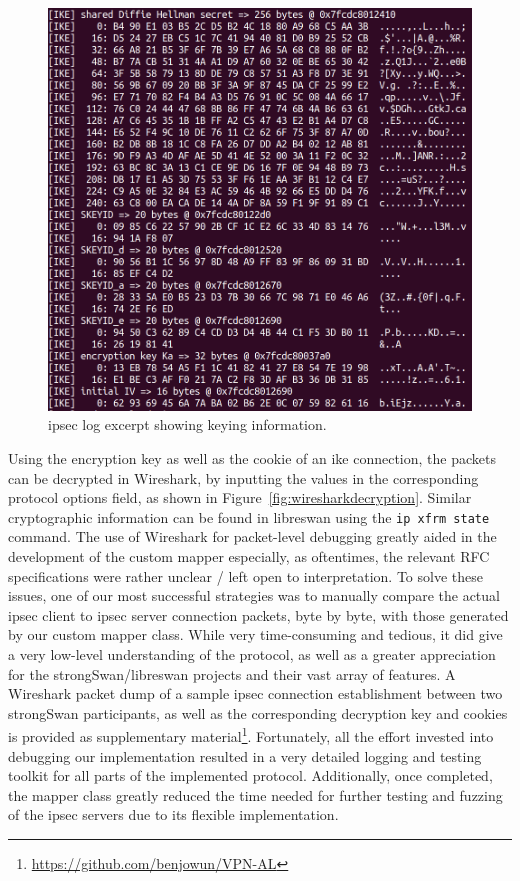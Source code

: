 \begin{figure}[h]
	\centering
	\includegraphics[width=0.7\linewidth]{images/key_material_log}
	\caption{\ac{ipsec} log excerpt showing keying information.}
	\label{fig:keymateriallog}
\end{figure}
\newpage

Using the encryption key as well as the cookie of an \ac{ike} connection, the packets can be decrypted in Wireshark, by inputting the values in the corresponding protocol options field, as shown in Figure~\ref{fig:wiresharkdecryption}. Similar cryptographic information can be found in libreswan using the \texttt{ip xfrm state} command. The use of Wireshark for packet-level debugging greatly aided in the development of the custom mapper especially, as oftentimes, the relevant RFC specifications were rather unclear / left open to interpretation. To solve these issues, one of our most successful strategies was to manually compare the actual \ac{ipsec} client to \ac{ipsec} server connection packets, byte by byte, with those generated by our custom mapper class. While very time-consuming and tedious, it did give a very low-level understanding of the protocol, as well as a greater appreciation for the strongSwan/libreswan projects and their vast array of features. A Wireshark packet dump of a sample \ac{ipsec} connection establishment between two strongSwan participants, as well as the corresponding decryption key and cookies is provided as supplementary material\footnote{\url{https://github.com/benjowun/VPN-AL}}. Fortunately, all the effort invested into debugging our implementation resulted in a very detailed logging and testing toolkit for all parts of the implemented protocol. Additionally, once completed, the mapper class greatly reduced the time needed for further testing and fuzzing of the \ac{ipsec} servers due to its flexible implementation.

